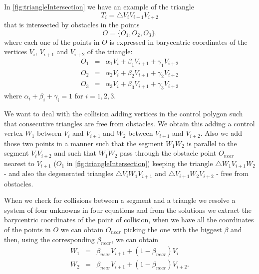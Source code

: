 \documentclass[dissertation.tex]{subfiles}
\begin{document}
In \cref{fig:triangleIntersection} we have an example of the triangle
\begin{equation*}
  T_i = \triangle V_iV_{i+1}V_{i+2} 
\end{equation*}
that is
intersected by obstacles in the points
\begin{equation*}
  O = \{O_1,O_2,O_3\}.
\end{equation*}
where each one of the points in $O$ is expressed in barycentric
coordinates of the vertices $V_i$, $V_{i+1}$ and $V_{i+2}$ of the
triangle:
\begin{eqnarray*}
  O_1&=&\alpha_1 V_i+\beta_1 V_{i+1}+\gamma_1 V_{i+2}\\
  O_2&=&\alpha_2 V_i+\beta_2 V_{i+1}+\gamma_2 V_{i+2}\\
  O_3&=&\alpha_3 V_i+\beta_3 V_{i+1}+\gamma_3 V_{i+2}
\end{eqnarray*}
where $\alpha_i+\beta_i+\gamma_i=1$ for $i=1,2,3$.

We want to deal with the collision adding vertices in the control
polygon such that consecutive triangles are free from obstacles. We
obtain this adding a control vertex $W_1$ between $V_i$ and $V_{i+1}$
and $W_2$ between $V_{i+1}$ and $V_{i+2}$. Also we add those two
points in a manner such that the segment $\overline{W_1W_2}$ is
parallel to the segment $\overline{V_iV_{i+2}}$ and such that
$\overline{W_1W_2}$ pass through the obstacle point $O_{near}$ nearest
to $V_{i+1}$ ($O_1$ in \cref{fig:triangleIntersection}) keeping the
triangle $\triangle W_1V_{i+1}W_2$ - and also
the degenerated triangles $\triangle V_iW_1V_{i+1}$ and $\triangle
V_{i+1}W_2V_{i+2}$ - free from obstacles.

When we check for collisions between a segment and a triangle we
resolve a system of four unknowns in
four equations and from the solutions we extract the barycentric
coordinates of
the point of collision, when we have all the coordinates of the points
in $O$ we can obtain $O_{near}$ picking the one with the biggest $\beta$
and then, using the corresponding $\beta_{near}$, we can obtain
\begin{eqnarray*}
  W_1&=&\beta_{near} V_{i+1}+(1-\beta_{near})V_i\\
  W_2&=&\beta_{near} V_{i+1}+(1-\beta_{near})V_{i+2}.
\end{eqnarray*}
\end{document}
